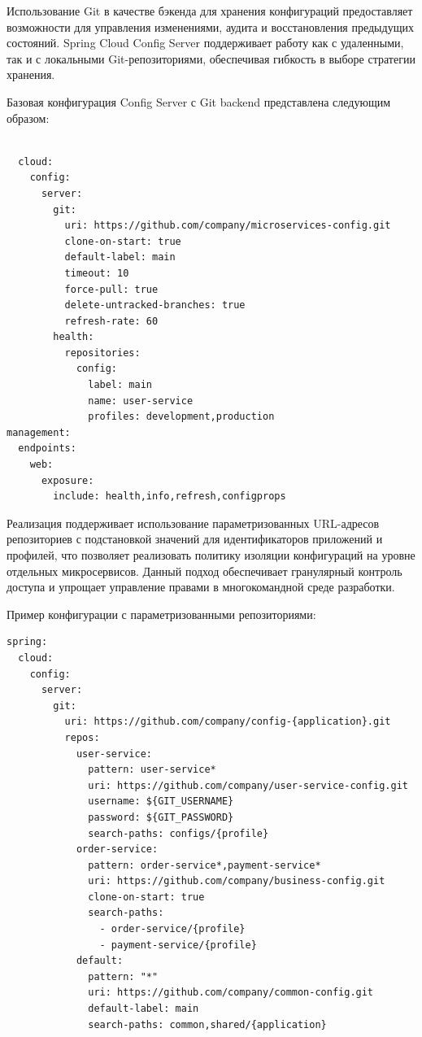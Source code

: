 Использование Git в качестве бэкенда для хранения конфигураций предоставляет возможности для управления изменениями, аудита и восстановления предыдущих состояний. Spring Cloud Config Server поддерживает работу как с удаленными, так и с локальными Git-репозиториями, обеспечивая гибкость в выборе стратегии хранения.

Базовая конфигурация Config Server с Git backend представлена следующим образом:

\begin{lstlisting}

  cloud:
    config:
      server:
        git:
          uri: https://github.com/company/microservices-config.git
          clone-on-start: true
          default-label: main
          timeout: 10
          force-pull: true
          delete-untracked-branches: true
          refresh-rate: 60
        health:
          repositories:
            config:
              label: main
              name: user-service
              profiles: development,production
management:
  endpoints:
    web:
      exposure:
        include: health,info,refresh,configprops
\end{lstlisting}

Реализация поддерживает использование параметризованных URL-адресов репозиториев с подстановкой значений для идентификаторов приложений и профилей, что позволяет реализовать политику изоляции конфигураций на уровне отдельных микросервисов. Данный подход обеспечивает гранулярный контроль доступа и упрощает управление правами в многокомандной среде разработки.

Пример конфигурации с параметризованными репозиториями:

\begin{lstlisting}
spring:
  cloud:
    config:
      server:
        git:
          uri: https://github.com/company/config-{application}.git
          repos:
            user-service:
              pattern: user-service*
              uri: https://github.com/company/user-service-config.git
              username: ${GIT_USERNAME}
              password: ${GIT_PASSWORD}
              search-paths: configs/{profile}
            order-service:
              pattern: order-service*,payment-service*
              uri: https://github.com/company/business-config.git
              clone-on-start: true
              search-paths:
                - order-service/{profile}
                - payment-service/{profile}
            default:
              pattern: "*"
              uri: https://github.com/company/common-config.git
              default-label: main
              search-paths: common,shared/{application}
\end{lstlisting}

